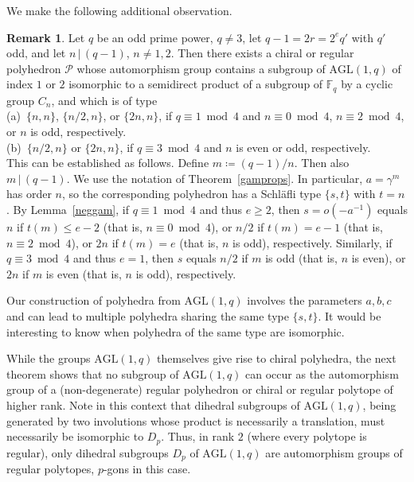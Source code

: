 \documentclass[12pt]{article}
\theoremstyle{definition}\newtheorem{definition}{Definition}[section]
\newtheorem{remark}{Remark}
\begin{document}
We make the following additional observation. 
\smallskip

\begin{remark}
\label{general pols}
Let $q$ be an odd prime power, $q\neq 3$, let $q-1=2r=2^eq'$ with $q'$ odd, and let $n\,|\,(q-1)$, $n\neq 1,2$. Then there exists a chiral or regular polyhedron $\mathcal{P}$ whose automorphism group contains a subgroup of $\mathrm{AGL}(1,q)$ of index $1$ or $2$ isomorphic to a semidirect product of a subgroup of $\mathbb{F}_q$ by a cyclic group $C_n$, and which is of type\\[.03in]
(a)\ $\{n,n\}$, $\{n/2,n\}$, or $\{2n,n\}$, if $q\equiv 1 \bmod 4$ and $n\equiv 0 \bmod 4$, $n\equiv 2 \bmod 4$, or $n$ is odd, respectively.\\[.03in]
(b)\ $\{n/2,n\}$ or $\{2n,n\}$, if $q\equiv 3 \bmod 4$ and $n$ is even or odd, 
respectively.\\[.03in]
This can be established as follows. Define $m\coloneqq (q-1)/n$. Then also $m\,|\,(q-1)$. We use the notation of Theorem~\ref{gamprops}. In particular, $a=\gamma^m$ has order $n$, so the corresponding polyhedron has a Schl\"afli type $\{s,t\}$ with $t=n$. By Lemma~\ref{neggam}, if $q\equiv 1\bmod 4$ and thus $e\geq 2$, then $s=o(-a^{-1})$ equals $n$ if $t(m)\leq e-2$ (that is, $n\equiv 0 \bmod 4$), or $n/2$ if $t(m)=e-1$ (that is, $n\equiv 2 \bmod 4$), or $2n$ if $t(m)=e$ (that is, $n$ is odd), respectively.
Similarly, if $q\equiv 3 \bmod 4$ and thus $e=1$, then $s$ equals $n/2$ if $m$ is odd (that is, $n$ is even), or $2n$ if $m$ is even (that is, $n$ is odd), respectively.
\end{remark}
\smallskip

Our construction of polyhedra from $\mathrm{AGL}(1,q)$ involves the parameters $a,b,c$ and can lead to multiple polyhedra sharing the same type $\{s,t\}$. It would be interesting to know when polyhedra of the same type are isomorphic. %
\medskip

While the groups $\mathrm{AGL}(1,q)$ themselves give rise to chiral polyhedra, the next theorem shows that no subgroup of $\mathrm{AGL}(1,q)$ can occur as the automorphism group of a (non-degenerate) regular polyhedron or chiral or regular polytope of higher rank. Note in this context that dihedral subgroups of $\mathrm{AGL}(1,q)$, being generated by two involutions whose product is necessarily a translation, must necessarily be isomorphic to $D_p$. Thus, in rank $2$ (where every polytope is regular), only dihedral subgroups $D_p$ of $\mathrm{AGL}(1,q)$ are automorphism groups of regular polytopes, $p$-gons in this case. 
\end{document}
